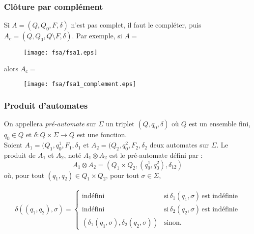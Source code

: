 \documentclass[a4paper]{article}
\begin{document}
  \subsubsection{Clôture par complément}
  Si $A = (Q, Q_0, F, \delta)$ n'est pas complet, il faut le compléter, puis
  $A_c = (Q, Q_0, Q \setminus F, \delta)$. Par exemple, si $A = $

  \begin{figure}[H]
    \begin{center}
      \texttt{[image: fsa/fsa1.eps]}
    \end{center}
  \end{figure}

  alors $A_c =$

  \begin{figure}[H]
    \begin{center}
      \texttt{[image: fsa/fsa1\_complement.eps]}
    \end{center}
  \end{figure}

  \subsubsection{Produit d'automates}
  On appellera \textit{pré-automate} sur $\Sigma$ un triplet $(Q, q_0, \delta)$
  où $Q$ est un ensemble fini, $q_0 \in Q$ et $\delta : Q \times \Sigma \rightarrow Q$
  est une fonction.\\

  Soient $A_1 = (Q_1, q_0^1, F_1, \delta_1$ et $A_2 = (Q_2, q_0^2, F_2, \delta_2$
  deux automates sur $\Sigma$. Le produit de $A_1$ et $A_2$, noté $A_1 \otimes A_2$
  est le pré-automate défini par : 
  $$ A_1 \otimes A_2 = (Q_1 \times Q_2, (q_0^1, q_0^2), \delta_{12})$$
  où, pour tout $(q_1, q_2) \in Q_1 \times Q_2$, pour tout $\sigma \in \Sigma$,

  \begin{center} 
    \begin{align*} 
     \delta((q_1, q_2), \sigma) = 
      \begin{cases}
        \text{indéfini} & \text{si}\, \delta_1(q_1, \sigma)\, \text{est indéfinie}\\
        \text{indéfini} & \text{si}\, \delta_2(q_2, \sigma)\, \text{est indéfinie}\\
        (\delta_1(q_1, \sigma), \delta_2(q_2, \sigma)) & \text{sinon}.
      \end{cases} 
    \end{align*} 
  \end{center} 
\end{document}
